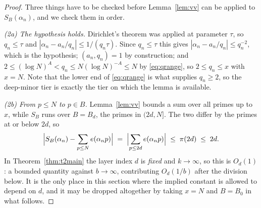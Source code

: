 \documentclass[11pt,a4paper]{article}
\theoremstyle{plain}
\theoremstyle{definition}
\theoremstyle{remark}
\begin{document}
\begin{proof}
Three things have to be checked before Lemma~\ref{lem:vv} can be applied to
$S_B(\alpha_n)$, and we check them in order.

\emph{(2a) The hypothesis holds.} Dirichlet's theorem was applied at parameter
$\tau$, so $q_n\le\tau$ and $|\alpha_n-a_n/q_n|\le1/(q_n\tau)$. Since
$q_n\le\tau$ this gives $|\alpha_n-a_n/q_n|\le q_n^{-2}$, which is the
hypothesis; $(a_n,q_n)=1$ by construction; and
$2\le(\log N)^{A}<q_n\le N(\log N)^{-A}\le N$ by \eqref{eq:qrange}, so
$2\le q_n\le x$ with $x=N$. Note that the lower end of \eqref{eq:qrange} is what
supplies $q_n\ge2$, so the deep-minor tier is exactly the tier on which the
lemma is available.

\emph{(2b) From $p\le N$ to $p\in B$.} Lemma~\ref{lem:vv} bounds a sum over all
primes up to $x$, while $S_B$ runs over $B=B_d$, the primes in $(2d,N]$. The two
differ by the primes at or below $2d$, so
\[
  \Bigl|S_B(\alpha_n)-\sum_{p\le N}e(\alpha_n p)\Bigr|
  \;=\;\Bigl|\sum_{p\le2d}e(\alpha_n p)\Bigr|\;\le\;\pi(2d)\;\le\;2d .
\]
In Theorem~\ref{thm:t2main} the layer index $d$ is \emph{fixed} and $k\to\infty$,
so this is $O_d(1)$: a bounded quantity against $b\to\infty$, contributing
$O_d(1/b)$ after the division below. It is the only place in this section where
the implied constant is allowed to depend on $d$, and it may be dropped
altogether by taking $x=N$ and $B=B_0$ in what follows.


\end{proof}
\end{document}
